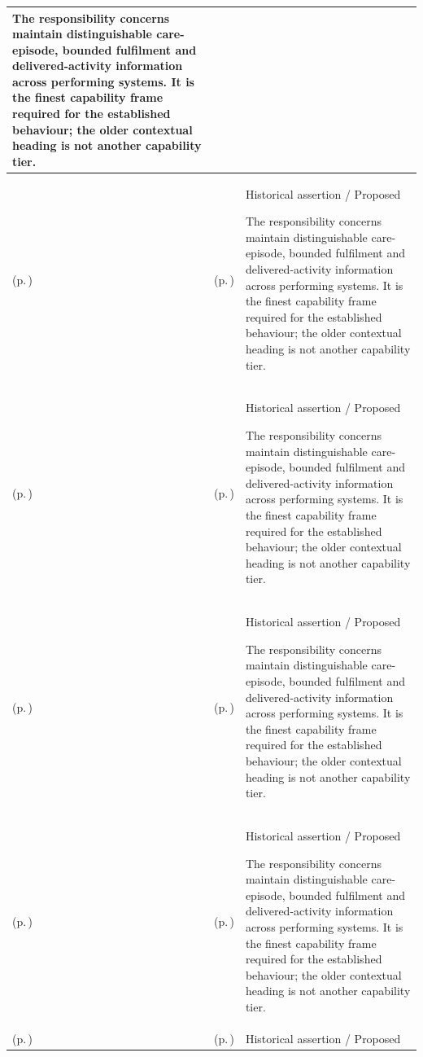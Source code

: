 \begin{longtable}{|>{\raggedright\arraybackslash}p{0.27\TableWidth}|>{\raggedright\arraybackslash}p{0.27\TableWidth}|>{\raggedright\arraybackslash}p{0.46\TableWidth}|}
The responsibility concerns maintain distinguishable care-episode, bounded fulfilment and delivered-activity information across performing systems. It is the finest capability frame required for the established behaviour; the older contextual heading is not another capability tier.\\\hline
\nameref{cap:bec-care-fulfilment-administration-enablement} (p.\,\pageref{cap:bec-care-fulfilment-administration-enablement}) & \nameref{cap:bec-order-administration} (p.\,\pageref{cap:bec-order-administration}) & Historical assertion / Proposed

The responsibility concerns maintain distinguishable care-episode, bounded fulfilment and delivered-activity information across performing systems. It is the finest capability frame required for the established behaviour; the older contextual heading is not another capability tier.\\\hline
\nameref{cap:bec-care-fulfilment-administration-enablement} (p.\,\pageref{cap:bec-care-fulfilment-administration-enablement}) & \nameref{cap:bec-diagnostic-administration} (p.\,\pageref{cap:bec-diagnostic-administration}) & Historical assertion / Proposed

The responsibility concerns maintain distinguishable care-episode, bounded fulfilment and delivered-activity information across performing systems. It is the finest capability frame required for the established behaviour; the older contextual heading is not another capability tier.\\\hline
\nameref{cap:bec-care-fulfilment-administration-enablement} (p.\,\pageref{cap:bec-care-fulfilment-administration-enablement}) & \nameref{cap:bec-medication-administration} (p.\,\pageref{cap:bec-medication-administration}) & Historical assertion / Proposed

The responsibility concerns maintain distinguishable care-episode, bounded fulfilment and delivered-activity information across performing systems. It is the finest capability frame required for the established behaviour; the older contextual heading is not another capability tier.\\\hline
\nameref{cap:bec-care-fulfilment-administration-enablement} (p.\,\pageref{cap:bec-care-fulfilment-administration-enablement}) & \nameref{cap:bec-procedure-administration} (p.\,\pageref{cap:bec-procedure-administration}) & Historical assertion / Proposed

The responsibility concerns maintain distinguishable care-episode, bounded fulfilment and delivered-activity information across performing systems. It is the finest capability frame required for the established behaviour; the older contextual heading is not another capability tier.\\\hline
\nameref{cap:bec-care-documentation-communication-enablement} (p.\,\pageref{cap:bec-care-documentation-communication-enablement}) & \nameref{cap:bec-clinical-record-administration} (p.\,\pageref{cap:bec-clinical-record-administration}) & Historical assertion / Proposed


\end{longtable}
